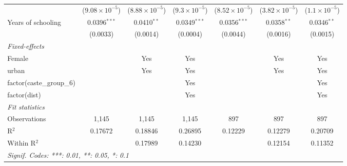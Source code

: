 \begin{table}[htbp]
{\begin{tabular}{lcccccc}
                                   & ($9.08\times 10^{-5}$)  & ($8.88\times 10^{-5}$)  & ($9.3\times 10^{-5}$)  & ($8.52\times 10^{-5}$)  & ($3.82\times 10^{-5}$)  & ($1.1\times 10^{-5}$)\\    
         Years of schooling        & 0.0396$^{***}$          & 0.0410$^{**}$           & 0.0349$^{***}$         & 0.0356$^{***}$          & 0.0358$^{**}$           & 0.0346$^{**}$\\   
                                   & (0.0033)                & (0.0014)                & (0.0004)               & (0.0044)                & (0.0016)                & (0.0015)\\   
         \midrule
         \emph{Fixed-effects}\\
         Female                    &                         & Yes                     & Yes                    &                         & Yes                     & Yes\\  
         urban                     &                         & Yes                     & Yes                    &                         & Yes                     & Yes\\  
         factor(caste\_group\_6)   &                         &                         & Yes                    &                         &                         & Yes\\  
         factor(dist)              &                         &                         & Yes                    &                         &                         & Yes\\  
         \midrule
         \emph{Fit statistics}\\
         Observations              & 1,145                   & 1,145                   & 1,145                  & 897                     & 897                     & 897\\  
         R$^2$                     & 0.17672                 & 0.18846                 & 0.26895                & 0.12229                 & 0.12279                 & 0.20709\\  
         Within R$^2$              &                         & 0.17989                 & 0.14230                &                         & 0.12154                 & 0.11352\\  
         \midrule \midrule
         \multicolumn{7}{l}{\emph{Signif. Codes: ***: 0.01, **: 0.05, *: 0.1}}\\
      \end{tabular}}
\end{table}


